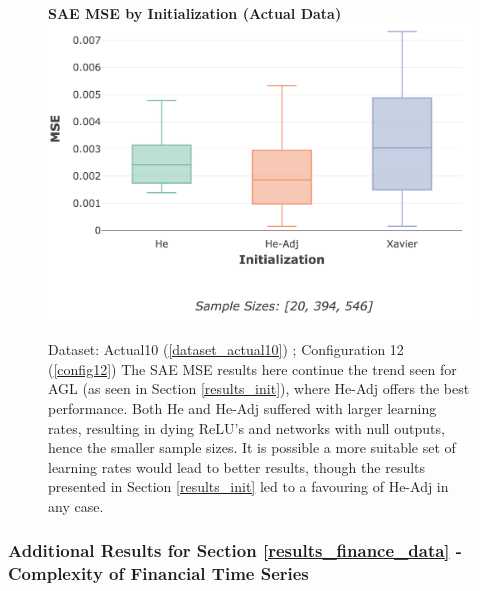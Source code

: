 \documentclass[a4paper,11pt,oneside]{article}
\theoremstyle{plain}
\theoremstyle{definition}
\begin{document}
	\begin{figure}[H]
		\centering 
		\textbf{SAE MSE by Initialization (Actual Data)} 
		\includegraphics[scale=0.3]{images/results/8_appendix/actual_mse_init.png}
		\caption[SAE MSE by Initialization (Actual Data)]{Dataset: Actual10 (\ref{dataset_actual10}) ; Configuration 12 (\ref{config12})
			\newline The SAE MSE results here continue the trend seen for AGL (as seen in Section \ref{results_init}), where He-Adj offers the best performance. Both He and He-Adj suffered with larger learning rates, resulting in dying ReLU's and networks with null outputs, hence the smaller sample sizes. It is possible a more suitable set of learning rates would lead to better results, though the results presented in Section \ref{results_init} led to a favouring of He-Adj in any case.}
		\label{figure-actual_mse_init}
	\end{figure}
	
	\subsubsection{Additional Results for Section \ref{results_finance_data} - Complexity of Financial Time Series}\label{results_appendix_finance_data}
	
\end{document}
